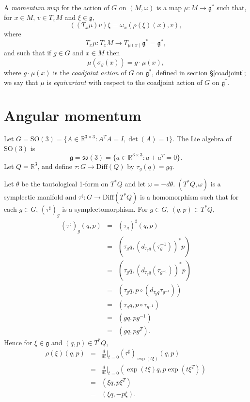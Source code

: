 \documentclass{article}
\newcommand{\SO}{\textrm{SO}}
\newcommand{\Diff}{\textrm{Diff}}
\begin{document}
A {\em momentum map} for the action of $G$ on $(M,\omega)$ is a map $\mu:M \to \mathfrak{g}^*$ such that, for  $x \in M$, $v \in T_x M$ and $\xi \in \mathfrak{g}$,
\begin{equation}
((T_x \mu)v )\xi=\omega_x (\rho(\xi)(x),v),
\label{mapcondition}
\end{equation}
where
\[
T_x\mu:T_x M \to T_{\mu(x)} \mathfrak{g}^*=\mathfrak{g}^*,
\]
and such that if $g \in G$ and $x \in M$ then
\begin{equation}
\mu(\sigma_g( x))=g \cdot  \mu(x),
\label{equivariant}
\end{equation}
where $g \cdot \mu(x)$ is the {\em coadjoint action} of $G$ on $\mathfrak{g}^*$, defined in  section \S \ref{coadjoint}; we say that
$\mu$ is {\em equivariant} with
respect to the coadjoint action of $G$ on $\mathfrak{g}^*$.

\section{Angular momentum}
Let $G=\SO(3)=\{A \in \mathbb{R}^{3 \times 3}: A^T A=I, \det(A)=1\}$. The Lie algebra of $\SO(3)$ is 
\[
\mathfrak{g}=\mathfrak{so}(3)=\{a \in \mathbb{R}^{3 \times 3}: a+a^T=0\}.
\]
Let $Q=\mathbb{R}^3$,
and define $\tau:G \to \Diff(Q)$ by $\tau_g(q)=gq$.

Let $\theta$ be the tautological 1-form on $T^*Q$ and let $\omega=-d\theta$. $(T^*Q,\omega)$ is a symplectic manifold and $\tau^\sharp:G \to \Diff(T^*Q)$ is a homomorphism such 
that for each $g \in G$, $(\tau^\sharp)_g$ is a symplectomorphism.
For $g \in G$, $(q,p) \in T^*Q$,
\begin{eqnarray*}
(\tau^\sharp)_g(q,p)&=&(\tau_g)^\sharp(q,p)\\
&=&(\tau_g q, (d_{\tau_g q} (\tau_g^{-1}))^* p)\\
&=&(\tau_g q, (d_{\tau_g q} (\tau_{g^{-1}}))^* p)\\
&=&(\tau_g q,p \circ (d_{\tau_g q} \tau_{g^{-1}}))\\
&=&(\tau_g q,p \circ \tau_{g^{-1}})\\
&=&(gq,pg^{-1})\\
&=&(gq,pg^T).
\end{eqnarray*}
Hence for $\xi \in \mathfrak{g}$ and $(q,p) \in T^*Q$,
\begin{eqnarray*}
\rho(\xi)(q,p)&=& \frac{d}{dt}\Big|_{t=0} (\tau^\sharp)_{\exp(t\xi)}(q,p)\\
&=& \frac{d}{dt}\Big|_{t=0} (\exp(t\xi)q,p\exp(t\xi^T))\\
&=&(\xi q,p \xi^T)\\
&=&(\xi q, -p\xi).
\end{eqnarray*}
\end{document}
